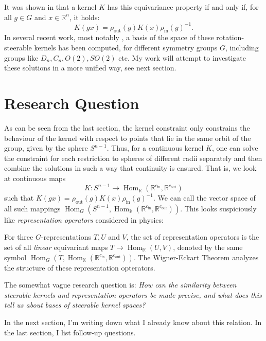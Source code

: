 \documentclass[12pt, a4paper]{article}
\theoremstyle{plain}
\theoremstyle{definition}
\theoremstyle{remark}
\newcommand{\R}{\mathds{R}}
\newcommand{\K}{\mathds{K}}
\DeclareMathOperator{\Hom}{Hom}
\DeclareMathOperator{\inn}{in}
\DeclareMathOperator{\out}{out}
\begin{document}
It was shown in \cite{3d_cnns} that a kernel $K$ has this equivariance property if and only if, for all $g \in G$ and $x \in \R^n$, it holds:
\begin{equation*}
K(gx) = \rho_{\out}(g) K(x) \rho_{\inn}(g)^{-1}.
\end{equation*}
In several recent work, most notably \cite{general_e2_cnns}, a basis of the space of these rotation-steerable kernels has been computed, for different symmetry groups $G$, including groups like $D_n, C_n, O(2), SO(2)$ etc. My work will attempt to investigate these solutions in a more unified way, see next section.

\section{Research Question}

As can be seen from the last section, the kernel constraint only constrains the behaviour of the kernel with respect to points that lie in the same orbit of the group, given by the sphere $S^{n-1}$. Thus, for a continuous kernel $K$, one can solve the constraint for each restriction to spheres of different radii separately and then combine the solutions in such a way that continuity is ensured. That is, we look at continuous maps
\begin{equation*}
K: S^{n-1} \to \Hom_{\R}(\R^{c_{\inn}}, \R^{c_{\out}})
\end{equation*}
such that $K(gx) = \rho_{\out}(g) K(x) \rho_{\inn}(g)^{-1}$. We can call the vector space of all such mappings $\Hom_G(S^{n-1}, \Hom_{\K}(\R^{c_{\inn}}, \R^{c_{\out}}))$. This looks suspiciously like \emph{representation operators} considered in physics:

For three $G$-representations $T, U$ and $V$, the set of representation operators is the set of all \emph{linear} equivariant maps $T \to \Hom_{\R}(U, V)$, denoted by the same symbol $\Hom_{G}(T, \Hom_{\K}(\R^{c_{\inn}}, \R^{c_{\out}}))$. The Wigner-Eckart Theorem \cite{wigner-eckart} analyzes the structure of these representation opterators. 

The somewhat vague research question is: \emph{How can the similarity between steerable kernels and representation operators be made precise, and what does this tell us about bases of steerable kernel spaces?}

In the next section, I'm writing down what I already know about this relation. In the last section, I list follow-up questions.
\end{document}
